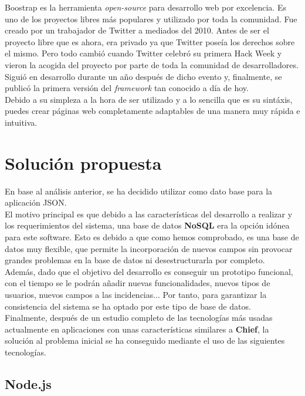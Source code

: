 Boostrap\cite{bootstrap} es la herramienta \textit{open-source} para desarrollo web por excelencia. Es uno de los proyectos libres más populares y utilizado por toda la comunidad.
Fue creado por un trabajador de Twitter a mediados del 2010. Antes de ser el proyecto libre que es ahora, era privado ya que Twitter poseía los derechos sobre el mismo.
Pero todo cambió cuando Twitter celebró su primera Hack Week\cite{hack-week} y vieron la acogida del proyecto por parte de toda la comunidad de desarrolladores. Siguió en desarrollo
durante un año después de dicho evento y, finalmente, se publicó la primera versión del \textit{framework} tan conocido a día de hoy.\\

Debido a su simpleza a la hora de ser utilizado y a lo sencilla que es su sintáxis, puedes crear páginas web completamente adaptables de una manera muy rápida e intuitiva.

\newpage

\section{Solución propuesta}

En base al análisis anterior, se ha decidido utilizar como dato base para la aplicación JSON\cite{json}.\\

El motivo principal es que debido a las características del desarrollo a realizar y los requerimientos del sistema,
una base de datos \textbf{NoSQL} era la opción idónea para este software. Esto es debido a que como hemos comprobado,
es una base de datos muy flexible, que permite la incorporación de nuevos campos sin provocar grandes problemas en 
la base de datos ni desestructurarla por completo.\\

Además, dado que el objetivo del desarrollo es conseguir un prototipo funcional, con el tiempo se le podrán añadir
nuevas funcionalidades, nuevos tipos de usuarios, nuevos campos a las incidencias... Por tanto, para garantizar 
la consistencia del sistema se ha optado por este tipo de base de datos.\\

Finalmente, después de un estudio completo de las tecnologías más usadas actualmente en aplicaciones con unas características similares a \textbf{Chief}, la solución al problema inicial se ha conseguido 
mediante el uso de las siguientes tecnologías.

\subsection{Node.js}

